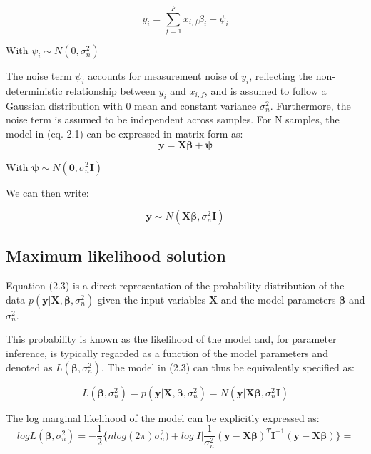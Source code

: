 \[ y_i = \sum_{f=1}^{F} x_{i,f}\beta_i + \psi_i  \]

With $ \psi_i \sim N(0, \sigma_n^2)$

\vspace{4mm}

The noise term $\psi_i$ accounts for measurement noise of $y_i$, reflecting the non-deterministic relationship between $y_i$ and $x_{i,f}$, and is assumed to follow a Gaussian distribution with 0 mean and constant variance $\sigma_n^2$. Furthermore, the noise term is assumed to be independent across samples. For N samples, the model in (eq. 2.1) can be expressed in matrix form as:
\[ \mathbf{y} = \mathbf{X}\boldsymbol{\beta} + \boldsymbol{\psi}  \]

With $ \boldsymbol{\psi} \sim N(\mathbf{0}, \sigma_n^2 \mathbf{I})$

\vspace{4mm}

We can then write:

\[ \mathbf{y} \sim N(\mathbf{X}\mathbf{\beta}, \sigma_n^2 \mathbf{I})  \]

\subsection{Maximum likelihood solution}

Equation (2.3) is a direct representation of the probability distribution of the data $p(\mathbf{y}| \mathbf{X}, \mathbf{\beta}, \sigma_n^2)$ given the input variables $\mathbf{X}$ and the model parameters $\boldsymbol{\beta}$ and $\sigma_n^2$. 

This probability is known as the likelihood of the model and, for parameter inference, is typically regarded as a function of the model parameters and denoted as $L(\boldsymbol{\beta}, \sigma_n^2)$. The model in (2.3) can thus be equivalently specified as:

\[ L(\boldsymbol{\beta}, \sigma_n^2) = p(\mathbf{y}| \mathbf{X}, \boldsymbol{\beta}, \sigma_n^2) = N(\mathbf{y} | \mathbf{X}\boldsymbol{\beta}, \sigma_n^2 \mathbf{I}) \]

\vspace{2mm} 
The log marginal likelihood of the model can be explicitly expressed as:
\vspace{2mm} 
\[ logL(\boldsymbol{\beta}, \sigma_n^2) = -\frac{1}{2} \bigg\{nlog(2\pi)\sigma_n^2) + log|I| \frac{1}{\sigma_n^2}(\mathbf{y}-\mathbf{X}\boldsymbol{\beta})^T\mathbf{I}^{-1}(\mathbf{y}-\mathbf{X}\boldsymbol{\beta}) \bigg\}  =\]
  
